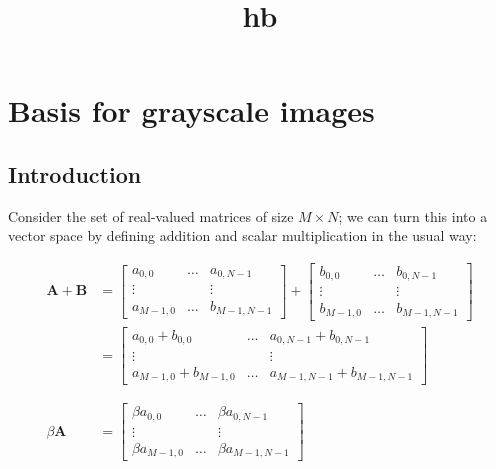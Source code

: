 \documentclass[11pt]{article}
\title{hb}
\begin{document}
    
    
    \maketitle
    
    

    
    \section{Basis for grayscale images}\label{basis-for-grayscale-images}

\subsection{Introduction}\label{introduction}

Consider the set of real-valued matrices of size \(M\times N\); we can
turn this into a vector space by defining addition and scalar
multiplication in the usual way:

\begin{align}
\mathbf{A} + \mathbf{B} &=  
    \left[ 
        \begin{array}{ccc} 
            a_{0,0} & \dots & a_{0,N-1} \\ 
            \vdots & & \vdots \\ 
            a_{M-1,0} & \dots & b_{M-1,N-1} 
        \end{array}
    \right]
    + 
    \left[ 
        \begin{array}{ccc} 
            b_{0,0} & \dots & b_{0,N-1} \\ 
            \vdots & & \vdots \\ 
            b_{M-1,0} & \dots & b_{M-1,N-1} 
        \end{array}
    \right]
    \\
    &=
    \left[ 
        \begin{array}{ccc} 
            a_{0,0}+b_{0,0} & \dots & a_{0,N-1}+b_{0,N-1} \\ 
            \vdots & & \vdots \\ 
            a_{M-1,0}+b_{M-1,0} & \dots & a_{M-1,N-1}+b_{M-1,N-1} 
        \end{array}
    \right]     
    \\ \\ \\
\beta\mathbf{A} &=  
    \left[ 
        \begin{array}{ccc} 
            \beta a_{0,0} & \dots & \beta a_{0,N-1} \\ 
            \vdots & & \vdots \\ 
            \beta a_{M-1,0} & \dots & \beta a_{M-1,N-1}
        \end{array}
    \right]
\end{align}
\end{document}
